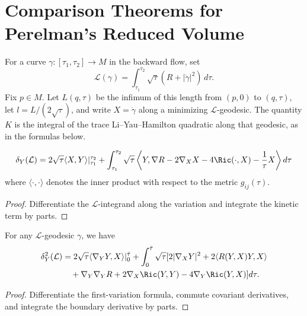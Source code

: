 \section{Comparison Theorems for Perelman's Reduced Volume}

For a curve $\gamma:[\tau_1,\tau_2]\to M$ in the backward flow, set
\[
\mathcal L(\gamma)=\int_{\tau_1}^{\tau_2}\sqrt\tau
(R+|\dot\gamma|^2)\,d\tau.
\]
Fix $p\in M$.  Let $L(q,\tau)$ be the infimum of this length from
$(p,0)$ to $(q,\tau)$, let $l=L/(2\sqrt\tau)$, and write $X=\dot\gamma$
along a minimizing $\mathcal L$-geodesic.  The quantity $K$ is the
integral of the trace Li--Yau--Hamilton quadratic along that geodesic,
as in the formulas below.

\begin{lemma}
  \label{lem:cz-first-variation-of-l-length}
$$
\delta_Y(\mathcal{L})=2\sqrt{\tau}\langle X,Y\rangle|_{\tau_1}^{\tau_2}
+\int_{\tau_1}^{\tau_2}\sqrt{\tau}\left\langle Y,\nabla
R-2\nabla_X X-4\Ric(\cdot,X)-\frac{1}{\tau}X\right\rangle d\tau
$$
where $\langle\cdot,\cdot\rangle$ denotes the inner product with respect to
the metric $g_{ij}(\tau)$.
\end{lemma}

\begin{proof}
  \sketch Differentiate the $\mathcal L$-integrand along the variation and integrate the kinetic term by parts.
\end{proof}

\begin{lemma}
  \label{lem:cz-second-variation-of-l-length}
For any $\mathcal{L}$-geodesic $\gamma$, we have
\begin{align*}
\delta_Y^2(\mathcal{L}) &
=2\sqrt{\tau}\langle\nabla_Y Y,X\rangle|_0^{\bar{\tau}}
+\int_0^{\bar{\tau}}\sqrt{\tau}[2|\nabla_XY|^2
+2\langle R(Y,X)Y,X\rangle\\
&\quad +\nabla_Y\nabla_YR+2\nabla_X{\Ric}(Y,Y)-4\nabla_Y
\Ric(Y,X)]d\tau.
\end{align*}
\end{lemma}

\begin{proof}
  \sketch Differentiate the first-variation formula, commute covariant derivatives, and integrate the boundary derivative by parts.
\end{proof}

